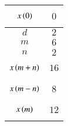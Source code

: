 \begin{tabular}{|p{4.5cm}|p{4.5cm}|}
    \hline
      $$x\left(0\right)$$ & $$0$$  \\ \hline
      $$d$$ & $$2$$  \\ \hline
      $$m$$ & $$6$$  \\ \hline
      $$n$$ & $$2$$  \\ \hline
      $$x\left(m+n\right)$$ & $$16$$  \\ \hline
      $$x\left(m-n\right)$$ & $$8$$  \\ \hline
      $$x\left(m\right)$$ & $$12$$  \\ \hline
\end{tabular}
